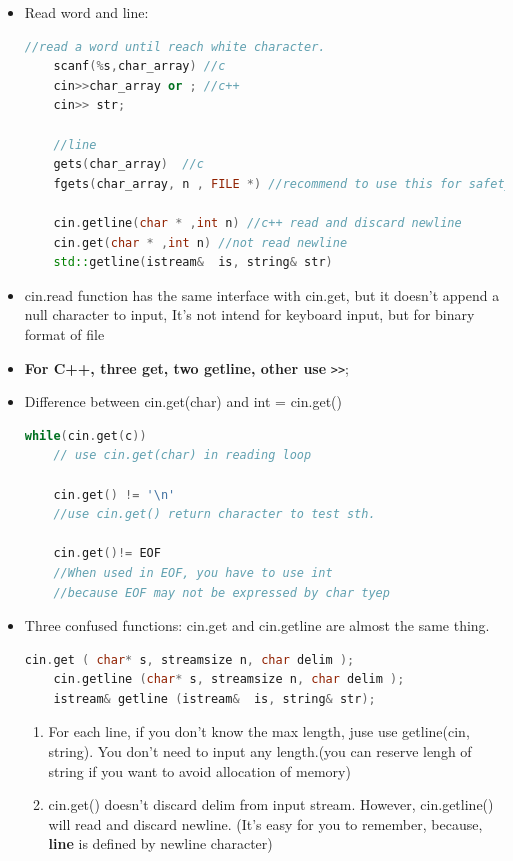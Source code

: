 \documentclass[a4paper,11pt,twoside]{book}
\begin{document}
\begin{itemize}
	\item Read word and line:
	\begin{lstlisting}[frame=single, language=c++]
	//read a word until reach white character.
	scanf(%s,char_array) //c
	cin>>char_array or ; //c++
	cin>> str;
	
	//line	
	gets(char_array)  //c
	fgets(char_array, n , FILE *) //recommend to use this for safety.
	
	cin.getline(char * ,int n) //c++ read and discard newline
	cin.get(char * ,int n) //not read newline
	std::getline(istream&  is, string& str)
	\end{lstlisting}
	
	\item cin.read function has the same interface with cin.get, but it doesn't append a null character to input, It's not intend for keyboard input, but for binary format of file
	
	\item \textbf{For C++, three get, two getline, other use} \verb|>>|;
	
	\item Difference between cin.get(char) and int = cin.get()
	\begin{lstlisting}[frame=single, language=c++]
	while(cin.get(c))
	// use cin.get(char) in reading loop
	
	cin.get() != '\n'
	//use cin.get() return character to test sth.
	
	cin.get()!= EOF
	//When used in EOF, you have to use int
	//because EOF may not be expressed by char tyep
	\end{lstlisting}
	
	\item Three confused functions: cin.get and cin.getline are almost the same thing.
	\begin{lstlisting}[frame=single, language=c++]
	cin.get ( char* s, streamsize n, char delim );
	cin.getline (char* s, streamsize n, char delim );
	istream& getline (istream&  is, string& str);
	\end{lstlisting}
	
	\begin{enumerate}
		
		\item For each line, if you don't know the max length, juse use getline(cin, string). You don't need to input any length.(you can reserve lengh of string if you want to avoid allocation of memory)
		
		\item cin.get() doesn't discard delim from input stream. However, cin.getline() will read and discard newline.  (It's easy for you to remember, because, \textbf{line} is defined by newline character)
		

\end{enumerate}
\end{itemize}
\end{document}
